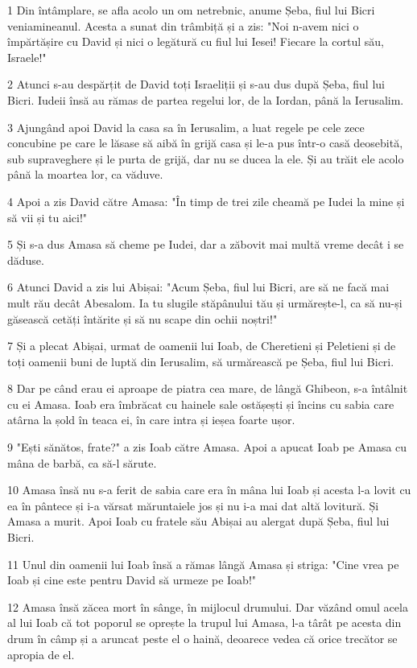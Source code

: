 \par 1 Din întâmplare, se afla acolo un om netrebnic, anume Șeba, fiul lui Bicri veniamineanul. Acesta a sunat din trâmbiță și a zis: "Noi n-avem nici o împărtășire cu David și nici o legătură cu fiul lui Iesei! Fiecare la cortul său, Israele!"
\par 2 Atunci s-au despărțit de David toți Israeliții și s-au dus după Șeba, fiul lui Bicri. Iudeii însă au rămas de partea regelui lor, de la Iordan, până la Ierusalim.
\par 3 Ajungând apoi David la casa sa în Ierusalim, a luat regele pe cele zece concubine pe care le lăsase să aibă în grijă casa și le-a pus într-o casă deosebită, sub supraveghere și le purta de grijă, dar nu se ducea la ele. Și au trăit ele acolo până la moartea lor, ca văduve.
\par 4 Apoi a zis David către Amasa: "În timp de trei zile cheamă pe Iudei la mine și să vii și tu aici!"
\par 5 Și s-a dus Amasa să cheme pe Iudei, dar a zăbovit mai multă vreme decât i se dăduse.
\par 6 Atunci David a zis lui Abișai: "Acum Șeba, fiul lui Bicri, are să ne facă mai mult rău decât Abesalom. Ia tu slugile stăpânului tău și urmărește-l, ca să nu-și găsească cetăți întărite și să nu scape din ochii noștri!"
\par 7 Și a plecat Abișai, urmat de oamenii lui Ioab, de Cheretieni și Peletieni și de toți oamenii buni de luptă din Ierusalim, să urmărească pe Șeba, fiul lui Bicri.
\par 8 Dar pe când erau ei aproape de piatra cea mare, de lângă Ghibeon, s-a întâlnit cu ei Amasa. Ioab era îmbrăcat cu hainele sale ostășești și încins cu sabia care atârna la șold în teaca ei, în care intra și ieșea foarte ușor.
\par 9 "Ești sănătos, frate?" a zis Ioab către Amasa. Apoi a apucat Ioab pe Amasa cu mâna de barbă, ca să-l sărute.
\par 10 Amasa însă nu s-a ferit de sabia care era în mâna lui Ioab și acesta l-a lovit cu ea în pântece și i-a vărsat măruntaiele jos și nu i-a mai dat altă lovitură. Și Amasa a murit. Apoi Ioab cu fratele său Abișai au alergat după Șeba, fiul lui Bicri.
\par 11 Unul din oamenii lui Ioab însă a rămas lângă Amasa și striga: "Cine vrea pe Ioab și cine este pentru David să urmeze pe Ioab!"
\par 12 Amasa însă zăcea mort în sânge, în mijlocul drumului. Dar văzând omul acela al lui Ioab că tot poporul se oprește la trupul lui Amasa, l-a târât pe acesta din drum în câmp și a aruncat peste el o haină, deoarece vedea că orice trecător se apropia de el.
